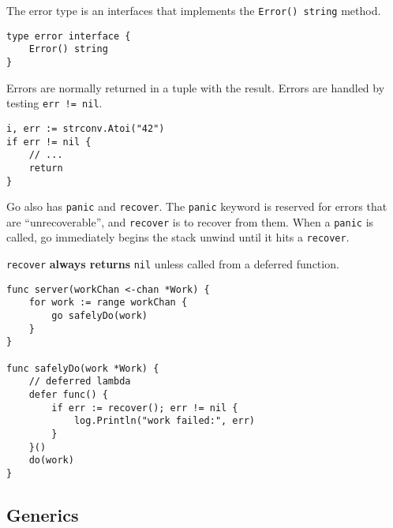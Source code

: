 \documentclass{article}
\begin{document}
\begin{paracol}{2}

The error type is an interfaces that implements the \lstinline|Error() string| method. 

\switchcolumn

\begin{lstlisting}
type error interface {
    Error() string
}
\end{lstlisting}

\switchcolumn*

\noindent Errors are normally returned in a tuple with the result. Errors are handled by testing \lstinline|err != nil|.

\switchcolumn

\begin{lstlisting}
i, err := strconv.Atoi("42")
if err != nil {
    // ...
    return
}
\end{lstlisting}

\switchcolumn*

\noindent Go also has \lstinline|panic| and \lstinline|recover|. The \lstinline|panic| keyword is reserved for errors that are ``unrecoverable'', and \lstinline|recover| is to recover from them. When a \lstinline|panic| is called, go immediately begins the stack unwind until it hits a \lstinline|recover|.

\lstinline{recover} \textbf{always returns} \lstinline|nil| unless called from a deferred function.

\switchcolumn

\begin{lstlisting}
func server(workChan <-chan *Work) {
    for work := range workChan {
        go safelyDo(work)
    }
}

func safelyDo(work *Work) {
    // deferred lambda
    defer func() {
        if err := recover(); err != nil {
            log.Println("work failed:", err)
        }
    }()
    do(work)
}
\end{lstlisting}

\end{paracol}

\subsection{Generics}\label{sec:generics}
\end{document}
